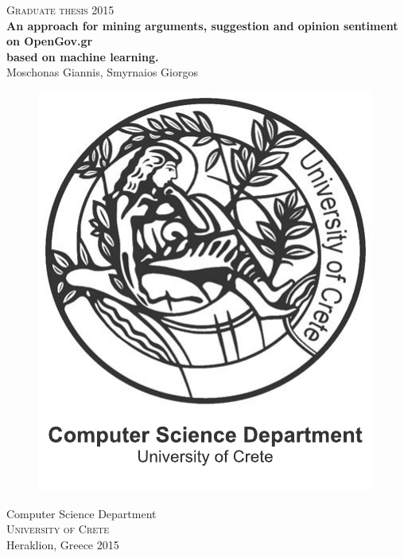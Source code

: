 \newpage
\restoregeometry
\thispagestyle{empty}
\mbox{}


\newpage
\thispagestyle{empty}
\begin{center}
	\textsc{\large Graduate thesis 2015}\\[4cm]		%
	\textbf{\Large An approach for mining arguments, suggestion and opinion sentiment on OpenGov.gr\\ based on machine learning.} \\[1cm]
	{\large Moschonas Giannis, Smyrnaios Giorgos}
	
	\vfill	
	\begin{figure}[H]
	\centering
	\includegraphics[width=0.2\pdfpagewidth]{figure/auxiliary/logo_eng.pdf} \\	
	\end{figure}	\vspace{5mm}	
	
	Computer Science Department \\
	\textsc{University of Crete} \\
	Heraklion, Greece 2015 \\
\end{center}


